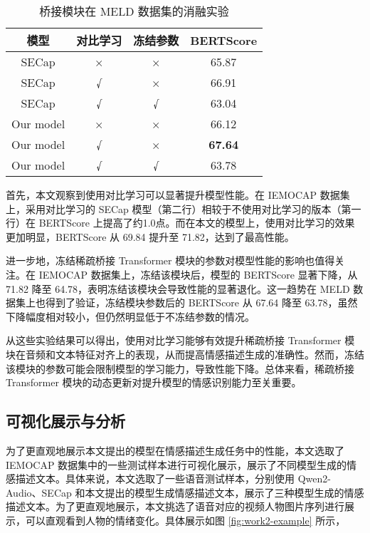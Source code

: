 \begin{table}
  \centering
  \caption{桥接模块在 MELD 数据集的消融实验}
  \label{tab:桥接模块在 MELD 数据集的消融实验}
  \begin{tabular}{cccc}
      \toprule
      模型 & 对比学习 & 冻结参数 & BERTScore \\
      \midrule
      SECap & × & × & 65.87 \\
      SECap & √ & × & 66.91 \\
      SECap & √ & √ & 63.04 \\
      Our model & × & × & 66.12 \\
      Our model & √ & × & \textbf{67.64} \\
      Our model & √ & √ & 63.78 \\
      \bottomrule
  \end{tabular}
\end{table}

首先，本文观察到使用对比学习可以显著提升模型性能。在 IEMOCAP 数据集上，采用对比学习的 SECap 模型（第二行）相较于不使用对比学习的版本（第一行）在 BERTScore 上提高了约1.0点。而在本文的模型上，使用对比学习的效果更加明显，BERTScore 从 69.84 提升至 71.82，达到了最高性能。

进一步地，冻结稀疏桥接 Transformer 模块的参数对模型性能的影响也值得关注。在 IEMOCAP 数据集上，冻结该模块后，模型的 BERTScore 显著下降，从 71.82 降至 64.78，表明冻结该模块会导致性能的显著退化。这一趋势在 MELD 数据集上也得到了验证，冻结模块参数后的 BERTScore 从 67.64 降至 63.78，虽然下降幅度相对较小，但仍然明显低于不冻结参数的情况。

从这些实验结果可以得出，使用对比学习能够有效提升稀疏桥接 Transformer 模块在音频和文本特征对齐上的表现，从而提高情感描述生成的准确性。然而，冻结该模块的参数可能会限制模型的学习能力，导致性能下降。总体来看，稀疏桥接 Transformer 模块的动态更新对提升模型的情感识别能力至关重要。

\subsection{可视化展示与分析}

为了更直观地展示本文提出的模型在情感描述生成任务中的性能，本文选取了 IEMOCAP 数据集中的一些测试样本进行可视化展示，展示了不同模型生成的情感描述文本。具体来说，本文选取了一些语音测试样本，分别使用 Qwen2-Audio、SECap 和本文提出的模型生成情感描述文本，展示了三种模型生成的情感描述文本。为了更直观地展示，本文挑选了语音对应的视频人物图片序列进行展示，可以直观看到人物的情绪变化。具体展示如图 \ref{fig:work2-example} 所示，

